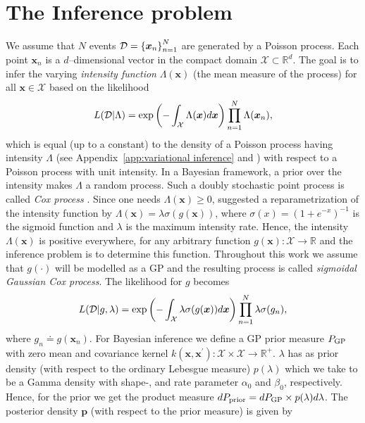 \documentclass[twoside,11pt]{article}
\newcommand{\dataset}{{\cal D}}
\newcommand{\set}[1]{\left\lbrace #1 \right\rbrace}
\newcommand{\bs}[1]{\boldsymbol{#1}}
\newcommand{\bx}{\boldsymbol{x}}
\newcommand{\R}{\mathbb{R}}
\newcommand{\X}{\mathcal{X}}
\begin{document}
\section{The Inference problem}\label{sec:inference problem}

We assume that $N$ events $\dataset = \set{\bs{x}_n}_{n=1}^N$ are generated by a Poisson process. Each point $\bs{x}_n$ is a $d$--dimensional vector in the compact domain $\X\subset \mathbb{R}^d$. The goal is to infer the varying {\it intensity function} $\Lambda(\bs{x})$ (the mean measure of the process) for all $\bs{x}\in\X$ based on the likelihood 
\begin{equation*}\label{eq:poisson_likelihood}
L(\dataset\vert \Lambda) = \exp\left(-\int_{\X}\Lambda(\bx)d\bx\right)\prod_{n=1}^N\Lambda(\bx_n),
\end{equation*}
which is equal (up to a constant)  to the density of a  Poisson process having intensity
$\Lambda$ (see Appendix~\ref{app:variational inference} and \citep{konstantopoulos2011radon}) with respect to a Poisson process with unit intensity. In a Bayesian framework, a prior over the intensity makes $\Lambda$
a random process. Such a doubly stochastic point process is called {\it Cox process} \citep{cox1955some}. 
Since one needs $\Lambda(\bx)\geq 0$,  \citet{adams2009tractable} suggested a reparametrization of the intensity function by $\Lambda(\bx)=\lambda\sigma(g(\bx))$, where $\sigma(x)=(1+e^{-x})^{-1}$ is the sigmoid function and $\lambda$ is the maximum intensity rate. Hence, the intensity $\Lambda(\bx)$ is positive everywhere, for any arbitrary function $g(\bx): \X \rightarrow \mathbb{R}$ and the inference problem is to determine this function. Throughout this work we assume that $g(\cdot)$ will be modelled as a GP \citep{rasmussen2006gaussian} and the resulting process is  called {\it sigmoidal Gaussian Cox process}.
 The likelihood for $g$ becomes
\begin{equation}\label{eq:sigmoid poisson likelihood}
L(\dataset \vert g,\lambda) = \exp\left(-\int_{\X}\lambda\sigma(g(\bx))d\bx\right)\prod_{n=1}^N\lambda\sigma(g_n),
\end{equation}
where $g_n\doteq g(\bx_n)$. For Bayesian inference we define a GP prior measure $P_{\rm GP}$ with zero mean and covariance kernel $k(\bx,\bx^\prime):\X\times\X \rightarrow \R^+$. $\lambda$ has as prior density (with respect to the ordinary Lebesgue measure) $p(\lambda)$ which we take to be a Gamma density with shape-, and rate parameter $\alpha_0$ and $\beta_0$, respectively. Hence, for the prior we get the product measure $dP_{\rm prior}= dP_{\rm GP} \times p(\lambda)d\lambda$. The posterior density $\bs{p}$ (with respect to the prior measure) is given by
\end{document}
